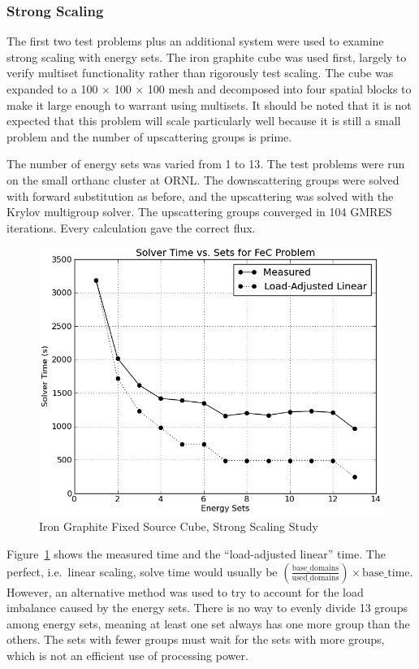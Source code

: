 \subsubsection{Strong Scaling}
The first two test problems plus an additional system were used to examine strong scaling with energy sets. The iron graphite cube was used first, largely to verify multiset functionality rather than rigorously test scaling. The cube was expanded to a 100 $\times$ 100 $\times$ 100 mesh and decomposed into four spatial blocks to make it large enough to warrant using multisets. It should be noted that it is not expected that this problem will scale particularly well because it is still a small problem and the number of upscattering groups is prime. 

The number of energy sets was varied from 1 to 13. The test problems were run on the small orthanc cluster at ORNL.  The downscattering groups were solved with forward substitution as before, and the upscattering was solved with the Krylov multigroup solver. The upscattering groups converged in 104 GMRES iterations. Every calculation gave the correct flux.

\begin{figure}[!h]
  \begin{center}
    \includegraphics [width=.75\textwidth, height=0.45\textheight ] {FeCKrylovMultisets}
  \end{center}
  \caption{Iron Graphite Fixed Source Cube, Strong Scaling Study}
  \label{fig:FeGraphiteStudy}
\end{figure}
%
Figure~\ref{fig:FeGraphiteStudy} shows the measured time and the ``load-adjusted linear'' time. The perfect, i.e.\ linear scaling, solve time would usually be $(\frac{\text{base\_domains}}{\text{used\_domains}}) \times \text{base\_time}$. However, an alternative method was used to try to account for the load imbalance caused by the energy sets. There is no way to evenly divide 13 groups among energy sets, meaning at least one set always has one more group than the others. The sets with fewer groups must wait for the sets with more groups, which is not an efficient use of processing power. 


